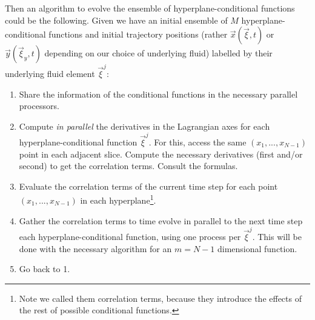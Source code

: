 \documentclass[11pt, a4paper]{article} %
\begin{document}
Then an algorithm to evolve the ensemble of hyperplane-conditional functions could be the following. Given we have an initial ensemble of $M$ hyperplane-conditional functions and initial trajectory positions (rather $\vec{x}(\vec{\xi},t)$ or $\vec{y}(\vec{\xi}_y,t)$ depending on our choice of underlying fluid) labelled by their underlying fluid element $\vec{\xi}^j$:
\begin{enumerate}
\item Share the information of the conditional functions in the necessary parallel processors.
\item Compute {\em in parallel} the derivatives in the Lagrangian axes for each hyperplane-conditional function $\vec{\xi}^j$. For this, access the same $(x_1,...,x_{N-1})$ point in each adjacent slice. Compute the necessary derivatives (first and/or second) to get the correlation terms. Consult the formulas.
\item Evaluate the correlation terms of the current time step for each point $(x_1,...,x_{N-1})$ in each hyperplane\footnote{Note we called them correlation terms, because they introduce the effects of the rest of possible conditional functions.}.
\item Gather the correlation terms to time evolve in parallel to the next time step each hyperplane-conditional function, using one process per $\vec{\xi}^j$. This will be done with the necessary algorithm for an $m=N-1$ dimensional function.
\item Go back to 1.
\end{enumerate}
\end{document}
